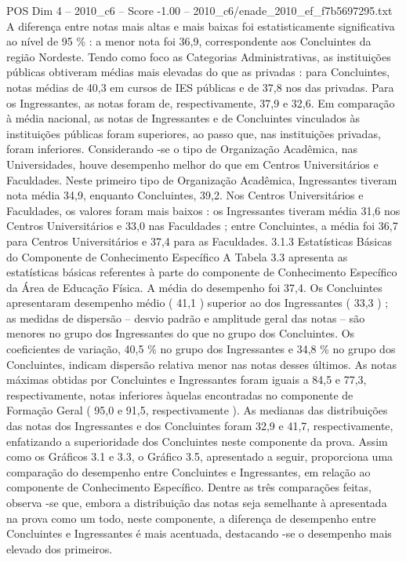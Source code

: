 \begin{textsample}{POS Dim 4 – 2010\_c6 – Score -1.00 – 2010\_c6/enade\_2010\_ef\_f7b5697295.txt}
A diferença entre notas mais altas e mais baixas foi estatisticamente significativa ao nível de 95 \% : a menor nota foi 36,9, correspondente aos Concluintes da região Nordeste.
Tendo como foco as Categorias Administrativas, as instituições públicas obtiveram médias mais elevadas do que as privadas : para Concluintes, notas médias de 40,3 em cursos de IES públicas e de 37,8 nos das privadas.
Para os Ingressantes, as notas foram de, respectivamente, 37,9 e 32,6.
Em comparação à média nacional, as notas de Ingressantes e de Concluintes vinculados às instituições públicas foram superiores, ao passo que, nas instituições privadas, foram inferiores.
Considerando -se o tipo de Organização Acadêmica, nas Universidades, houve desempenho melhor do que em Centros Universitários e Faculdades.
Neste primeiro tipo de Organização Acadêmica, Ingressantes tiveram nota média 34,9, enquanto Concluintes, 39,2.
Nos Centros Universitários e Faculdades, os valores foram mais baixos : os Ingressantes tiveram média 31,6 nos Centros Universitários e 33,0 nas Faculdades ; entre Concluintes, a média foi 36,7 para Centros Universitários e 37,4 para as Faculdades. 3.1.3 Estatísticas Básicas do Componente de Conhecimento Específico A Tabela 3.3 apresenta as estatísticas básicas referentes à parte do componente de Conhecimento Específico da Área de Educação Física.
A média do desempenho foi 37,4.
Os Concluintes apresentaram desempenho médio ( 41,1 ) superior ao dos Ingressantes ( 33,3 ) ; as medidas de dispersão – desvio padrão e amplitude geral das notas – são menores no grupo dos Ingressantes do que no grupo dos Concluintes.
Os coeficientes de variação, 40,5 \% no grupo dos Ingressantes e 34,8 \% no grupo dos Concluintes, indicam dispersão relativa menor nas notas desses últimos.
As notas máximas obtidas por Concluintes e Ingressantes foram iguais a 84,5 e 77,3, respectivamente, notas inferiores àquelas encontradas no componente de Formação Geral ( 95,0 e 91,5, respectivamente ).
As medianas das distribuições das notas dos Ingressantes e dos Concluintes foram 32,9 e 41,7, respectivamente, enfatizando a superioridade dos Concluintes neste componente da prova.
Assim como os Gráficos 3.1 e 3.3, o Gráfico 3.5, apresentado a seguir, proporciona uma comparação do desempenho entre Concluintes e Ingressantes, em relação ao componente de Conhecimento Específico.
Dentre as três comparações feitas, observa -se que, embora a distribuição das notas seja semelhante à apresentada na prova como um todo, neste componente, a diferença de desempenho entre Concluintes e Ingressantes é mais acentuada, destacando -se o desempenho mais elevado dos primeiros.

\end{textsample}
